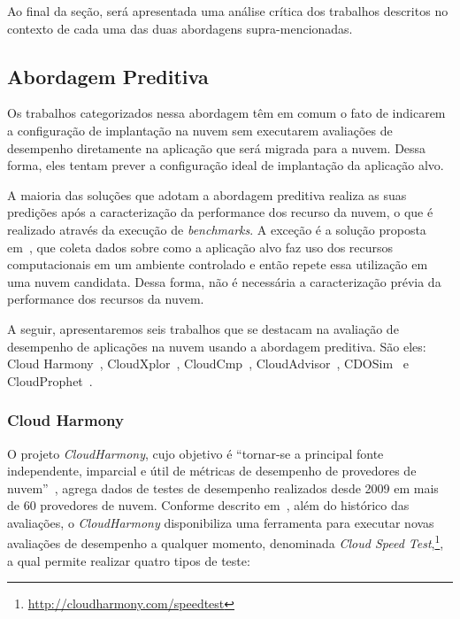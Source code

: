 Ao final da seção, será apresentada uma análise crítica dos trabalhos descritos no contexto de cada uma das duas abordagens supra-mencionadas.

\subsection{Abordagem Preditiva}

Os trabalhos categorizados nessa abordagem têm em comum o fato de
indicarem a configuração de implantação na nuvem sem executarem avaliações de
desempenho diretamente na aplicação que será migrada para a nuvem. Dessa forma,
eles tentam prever a configuração ideal de implantação da aplicação alvo.

A maioria das soluções que adotam a abordagem preditiva realiza as
suas predições após a caracterização da performance dos recurso da nuvem, o que
é realizado através da execução de \textit{benchmarks}. A exceção é a solução proposta em~\cite{li2011cloudprophet}, que coleta dados sobre como a
aplicação alvo faz uso dos recursos computacionais em um ambiente controlado e
então repete essa utilização em uma nuvem candidata. Dessa forma, não é necessária a caracterização prévia da performance dos recursos da nuvem.

A seguir, apresentaremos seis trabalhos que se destacam na avaliação de
desempenho de aplicações na nuvem usando a abordagem preditiva. São
eles: Cloud Harmony~\cite{cloudharmony}, CloudXplor~\cite{malkowski2010cloudxplor}, CloudCmp~\cite{li2011}, CloudAdvisor~\cite{jung2013cloudadvisor}, CDOSim~\cite{fittkau2012cdosim}
e CloudProphet~\cite{li2011cloudprophet}.

\subsubsection{Cloud Harmony}
O projeto {\em CloudHarmony}, cujo
objetivo é ``tornar-se a principal fonte independente, imparcial e útil de
métricas de desempenho de provedores de nuvem''~\cite{cloudharmony}, agrega
dados de testes de desempenho realizados desde 2009 em mais de 60 provedores de
nuvem. Conforme descrito em~\cite{cunha2012ambiente}, além do histórico das
avaliações, o {\em CloudHarmony} disponibiliza uma ferramenta para executar novas avaliações de desempenho a qualquer momento, denominada \textit{Cloud Speed Test},\footnote{\url{http://cloudharmony.com/speedtest}}, a qual permite realizar quatro tipos de teste:

